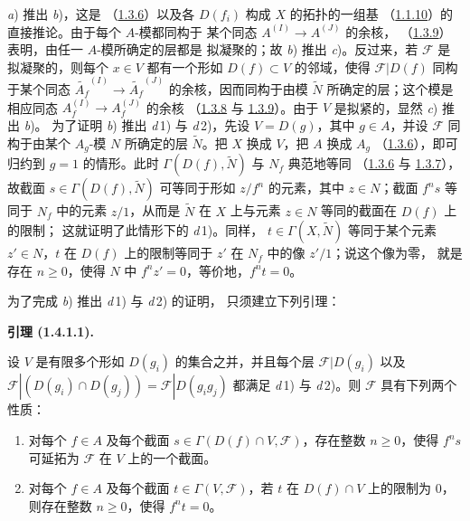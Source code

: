 \documentclass[UTF8,fontset=none,11pt,oneside,openany]{ctexbook}
\newenvironment{lemma}[1][]{%
  \par\medskip\noindent\textbf{引理 (#1).}\ %
}{\par}
\newcommand{\oldpage}[2][]{%
  \hypertarget{ega-source-page-#1-#2}{}%
  \marginnote{\scriptsize\textbf{#1}~|~#2}\ignorespaces}
\let\EGAOriginalLabel\label
\renewcommand{\label}[1]{\phantomsection\EGAOriginalLabel{#1}}
\begin{document}
\textit{a}) 推出 \textit{b})，这是
（\hyperref[I.1.3.6-fr]{1.3.6}）以及各 $D(f_i)$ 构成 $X$ 的拓扑的一组基
（\hyperref[I.1.1.10-fr]{1.1.10}）的直接推论。由于每个 $A$-模都同构于
某个同态 $A^{(I)}\to A^{(J)}$ 的余核，
（\hyperref[I.1.3.9-fr]{1.3.9}）表明，由任一 $A$-模所确定的层都是
拟凝聚的；故 \textit{b}) 推出 \textit{c})。反过来，若 $\mathscr{F}$
是拟凝聚的，则每个 $x\in V$ 都有一个形如 $D(f)\subset V$ 的邻域，使得
$\mathscr{F}|D(f)$ 同构于某个同态
$\widetilde{A_f}^{(I)}\to\widetilde{A_f}^{(J)}$ 的余核，因而同构于由模
$\widetilde{N}$ 所确定的层；这个模是相应同态
$A_f^{(I)}\to A_f^{(J)}$ 的余核
（\hyperref[I.1.3.8-fr]{1.3.8} 与
\hyperref[I.1.3.9-fr]{1.3.9}）。由于 $V$ 是拟紧的，显然
\textit{c}) 推出 \textit{b})。
\oldpage[I]{91}
为了证明 \textit{b}) 推出 \textit{d}\,1) 与 \textit{d}\,2)，先设
$V=D(g)$，其中 $g\in A$，并设 $\mathscr{F}$ 同构于由某个 $A_g$-模
$N$ 所确定的层 $\widetilde{N}$。把 $X$ 换成 $V$，把 $A$ 换成 $A_g$
（\hyperref[I.1.3.6-fr]{1.3.6}），即可归约到 $g=1$ 的情形。此时
$\Gamma(D(f),\widetilde{N})$ 与 $N_f$ 典范地等同
（\hyperref[I.1.3.6-fr]{1.3.6} 与
\hyperref[I.1.3.7-fr]{1.3.7}），故截面
$s\in\Gamma(D(f),\widetilde{N})$ 可等同于形如 $z/f^n$ 的元素，其中
$z\in N$；截面 $f^n s$ 等同于 $N_f$ 中的元素 $z/1$，从而是
$\widetilde{N}$ 在 $X$ 上与元素 $z\in N$ 等同的截面在 $D(f)$ 上的限制；
这就证明了此情形下的 \textit{d}\,1)。同样，
$t\in\Gamma(X,\widetilde{N})$ 等同于某个元素 $z'\in N$，$t$ 在
$D(f)$ 上的限制等同于 $z'$ 在 $N_f$ 中的像 $z'/1$；说这个像为零，
就是存在 $n\geq0$，使得 $N$ 中 $f^n z'=0$，等价地，$f^n t=0$。

为了完成 \textit{b}) 推出 \textit{d}\,1) 与 \textit{d}\,2) 的证明，
只须建立下列引理：

\begin{lemma}[1.4.1.1]
\label{I.1.4.1.1-fr}
设 $V$ 是有限多个形如 $D(g_i)$ 的集合之并，并且每个层
$\mathscr{F}|D(g_i)$ 以及
$\mathscr{F}|(D(g_i)\cap D(g_j))=\mathscr{F}|D(g_i g_j)$ 都满足
\textit{d}\,1) 与 \textit{d}\,2)。则 $\mathscr{F}$ 具有下列两个性质：
\begin{enumerate}
  \item[\textit{d}'\,1)] 对每个 $f\in A$ 及每个截面
  $s\in\Gamma(D(f)\cap V,\mathscr{F})$，存在整数 $n\geq0$，使得
  $f^n s$ 可延拓为 $\mathscr{F}$ 在 $V$ 上的一个截面。
  \item[\textit{d}'\,2)] 对每个 $f\in A$ 及每个截面
  $t\in\Gamma(V,\mathscr{F})$，若 $t$ 在 $D(f)\cap V$ 上的限制为 $0$，
  则存在整数 $n\geq0$，使得 $f^n t=0$。
\end{enumerate}
\end{lemma}
\end{document}
